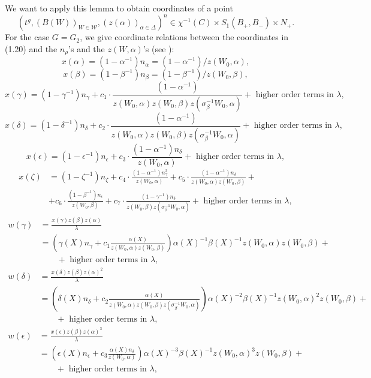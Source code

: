 \documentclass[12pt,letterpaper]{amsart}
\begin{document}
We want to apply this lemma to obtain coordinates of a point
\[
(t^g,(B(W))_{W\in{\mathcal W}},(z(\alpha))_{\alpha\in\Delta})^n\in
\chi^{-1}(C)\times S_1(B_+,B_-)\times N_+.
\]
For the case $G=G_2$, we
give coordinate relations between the coordinates in (1.20) and
the $n_\rho$'s and the $z(W,\alpha)$'s (see \cite[chap II]{Ha92a}):
\[
x(\alpha)=(1-\alpha^{-1})n_\alpha = (1-\alpha^{-1})/z(W_0,\alpha),
\tag{1.22}
\]
\[
x(\beta)=(1-\beta^{-1})n_\beta = (1-\beta^{-1})/z(W_0,\beta),
\]
\[
x(\gamma)=(1-\gamma^{-1})n_\gamma +
c_1\cdot \frac{(1-\alpha^{-1})}{{z(W_0,\alpha)z(W_0,\beta)z(\sigma_\beta^{-1}W_0,\alpha)}}
+\text{ higher order terms in }\lambda,
\]
\[
x(\delta)=(1-\delta^{-1})n_\delta +
c_2\cdot \frac{(1-\alpha^{-1})}{{z(W_0,\alpha)z(W_0,\beta)z(\sigma_\beta^{-1}W_0,\alpha)}}
+\text{ higher order terms in }\lambda,
\]
\[
x(\epsilon)=(1-\epsilon^{-1})n_\epsilon +
c_3\cdot \frac{(1-\alpha^{-1})n_\delta}{{z(W_0,\alpha)}}
+\text{ higher order terms in }\lambda,
\]
\[
\begin{split}
x(\zeta)
&=(1-\zeta^{-1})n_\zeta +
c_4\cdot \frac{(1-\alpha^{-1})n_\gamma^2}{{z(W_0,\alpha)}}+
c_5\cdot \frac{(1-\alpha^{-1})n_\delta}{{z(W_0,\alpha)z(W_0,\beta)}}+\\
&+c_6\cdot \frac{(1-\beta^{-1})n_\epsilon}{{z(W_0,\beta)}}+
c_7\cdot \frac{(1-\gamma^{-1})n_\delta}{{z(W_0,\beta)z(\sigma_\beta^{-1}W_0,\alpha)}}
+\text{ higher order terms in }\lambda,
\end{split}
\]
\[
\begin{split}
w(\gamma)
&=\frac{x(\gamma)z(\beta)z(\alpha)}{\lambda}\\
&=(\gamma(X)n_\gamma + c_1\frac{\alpha(X)}{{z(W_0,\alpha)z(W_0,\beta)}})
\alpha(X)^{-1}\beta(X)^{-1}z(W_0,\alpha)z(W_0,\beta)+\\
&\quad\quad +\text{ higher order terms in }\lambda,
\end{split}
\]
\[
\begin{split}
w(\delta)
&=\frac{x(\delta)z(\beta)z(\alpha)^2}{\lambda}\\
&=(\delta(X)n_\delta +
c_2\frac{\alpha(X)}{{z(W_0,\alpha)z(W_0,\beta)z(\sigma_\beta^{-1}W_0,\alpha)}})
\alpha(X)^{-2}\beta(X)^{-1}z(W_0,\alpha)^2z(W_0,\beta)+\\
&\quad\quad +\text{ higher order terms in }\lambda,
\end{split}
\]
\[
\begin{split}
w(\epsilon)
&=\frac{x(\epsilon)z(\beta)z(\alpha)^3}{\lambda}\\
&=(\epsilon(X)n_\epsilon + c_3\frac{\alpha(X)n_\delta}{{z(W_0,\alpha)}})
\alpha(X)^{-3}\beta(X)^{-1}z(W_0,\alpha)^3z(W_0,\beta)+\\
&\quad\quad +\text{ higher order terms in }\lambda,
\end{split}
\]
\end{document}
